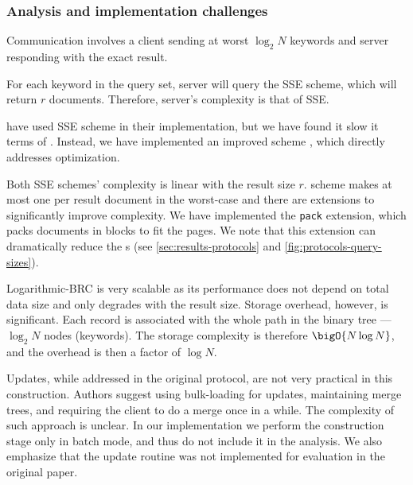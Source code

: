 	\subsubsection{Analysis and implementation challenges}

		Communication involves a client sending at worst $\log_2 N$ keywords and server responding with the exact result.

		For each keyword in the query set, server will query the SSE scheme, which will return $r$ documents.
		Therefore, server's {\IO} complexity is that of SSE\@.

		\textcite{practical-range-search} have used \cite{cjjkrs-13} SSE scheme in their implementation, but we have found it slow it terms of {\IO}.
		Instead, we have implemented an improved scheme \cite{cjjjkrs-14}, which directly addresses {\IO} optimization.

		Both SSE schemes' {\IO} complexity is linear with the result size $r$.
		\cite{cjjjkrs-14} scheme makes at most one {\IO} per result document in the worst-case and there are extensions to significantly improve {\IO} complexity. %
		We have implemented the \texttt{pack} extension, which packs documents in blocks to fit the {\IO} pages.
		We note that this extension can dramatically reduce the {\IO}s (see \cref{sec:results-protocols} and \cref{fig:protocols-query-sizes}).

		Logarithmic\hyp{}BRC is very scalable as its performance does not depend on total data size and only degrades with the result size.
		Storage overhead, however, is significant.
		Each record is associated with the whole path in the binary tree --- $\log_2 N$ nodes (keywords).
		The storage complexity is therefore $\bigO{N \log N}$, and the overhead is then a factor of $\log N$.

		Updates, while addressed in the original protocol, are not very practical in this construction.
		Authors suggest using bulk-loading for updates, maintaining merge trees, and requiring the client to do a merge once in a while.
		The {\IO} complexity of such approach is unclear.
		In our implementation we perform the construction stage only in batch mode, and thus do not include it in the analysis.
		We also emphasize that the update routine was not implemented for evaluation in the original paper.
